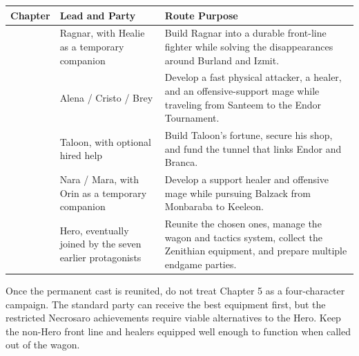 \documentclass[
  american,
  10pt,
  letterpaper,
  oneside,
  open=any]{scrreprt}
\newcounter{none} %
\newenvironment{guidetable}{%
  \small\setstretch{1.0}%
  \setlength{\tabcolsep}{4pt}%
  \setlength{\LTpre}{8pt}\setlength{\LTpost}{10pt}%
  \renewcommand{\arraystretch}{1.16}%
}{ }
\begin{document}
\begin{guidetable}

{\def\LTcaptype{none} %
\begin{longtable}[]{@{}
  >{\raggedright\arraybackslash}p{}
  >{\raggedright\arraybackslash}p{}
  >{\raggedright\arraybackslash}p{}@{}}
\toprule\noalign{}
\begin{minipage}[b]{\linewidth}\raggedright
\color{GuideGreen}\bfseries Chapter
\end{minipage} & \begin{minipage}[b]{\linewidth}\raggedright
\color{GuideGreen}\bfseries Lead and Party
\end{minipage} & \begin{minipage}[b]{\linewidth}\raggedright
\color{GuideGreen}\bfseries Route Purpose
\end{minipage} \\
\midrule\noalign{}
\endhead
\bottomrule\noalign{}
\endlastfoot
1 & Ragnar, with Healie as a temporary companion & Build Ragnar into a
durable front-line fighter while solving the disappearances around
Burland and Izmit. \\
2 & Alena / Cristo / Brey & Develop a fast physical attacker, a healer,
and an offensive-support mage while traveling from Santeem to the Endor
Tournament. \\
3 & Taloon, with optional hired help & Build Taloon's fortune, secure
his shop, and fund the tunnel that links Endor and Branca. \\
4 & Nara / Mara, with Orin as a temporary companion & Develop a support
healer and offensive mage while pursuing Balzack from Monbaraba to
Keeleon. \\
5 & Hero, eventually joined by the seven earlier protagonists & Reunite
the chosen ones, manage the wagon and tactics system, collect the
Zenithian equipment, and prepare multiple endgame parties. \\
\end{longtable}
}

\end{guidetable}

Once the permanent cast is reunited, do not treat Chapter 5 as a
four-character campaign. The standard party can receive the best
equipment first, but the restricted Necrosaro achievements require
viable alternatives to the Hero. Keep the non-Hero front line and
healers equipped well enough to function when called out of the wagon.
\end{document}
